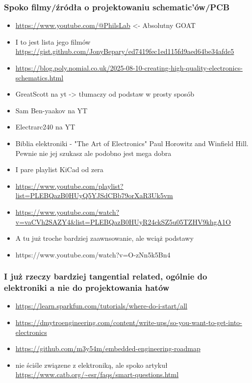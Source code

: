 \documentclass[b5paper, 10pt, twoside]{book}
\begin{document}
\subsubsection{Spoko filmy/źródła o projektowaniu schematic'ów/PCB}
\begin{itemize}
  \item \url{https://www.youtube.com/@PhilsLab} <- Absolutny GOAT
  \item I to  jest lista jego filmów \url{https://gist.github.com/JonyBepary/ed7419fec1ed115fd9aed64be34afde5}
  \item \url{https://blog.poly.nomial.co.uk/2025-08-10-creating-high-quality-electronics-schematics.html}
  \item GreatScott na yt -> tłumaczy od podstaw w prosty sposób
  \item Sam Ben-yaakov na YT
  \item Electrarc240 na YT
  \item Biblia elektroniki - "The Art of Electronics" Paul Horowitz and Winfield Hill. Pewnie nie jej szukasz ale podobno jest mega dobra 
  \item I pare playlist KiCad od zera
  \item \url{https://www.youtube.com/playlist?list=PLEBQazB0HUyQ5YJSdCBb79orXaR3Uk5vm}
  \item \url{https://www.youtube.com/watch?v=vaCVh2SAZY4&list=PLEBQazB0HUyR24ckSZ5u05TZHV9khgA1O}
  \item A tu już troche bardziej zaawnsowanie, ale wciąż podstawy
  \item https://www.youtube.com/watch?v=O-zNn5k5Bn4
\end{itemize}

\subsubsection{I już rzeczy bardziej tangential related, ogólnie do elektroniki a nie do projektowania hatów}
\begin{itemize}
  \item \url{https://learn.sparkfun.com/tutorials/where-do-i-start/all}
  \item \url{https://dmytroengineering.com/content/write-ups/so-you-want-to-get-into-electronics}
  \item \url{https://github.com/m3y54m/embedded-engineering-roadmap}
  \item nie ściśle związene z elektroniką, ale spoko artykuł \url{https://www.catb.org/~esr/faqs/smart-questions.html}
\end{itemize}
\end{document}

